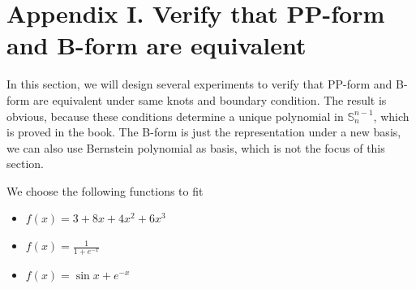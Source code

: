 \documentclass[a4paper]{article}
\begin{document}
\section{Appendix I. Verify that PP-form and B-form are equivalent}

In this section, we will design several experiments to verify that PP-form and B-form are equivalent under same knots and boundary condition. 
The result is obvious, because these conditions determine a unique polynomial in $\mathbb{S}_{n}^{n-1}$, which is proved in the book. The B-form is just 
the representation under a new basis, we can also use Bernstein polynomial as basis, which is not the focus of this section.

We choose the following functions to fit
\begin{itemize}
    \item $f(x) = 3+8x+4x^2+6x^3$
    \item $f(x) = \frac{1}{1 + e^{-x}}$
    \item $f(x) = \sin x + e^{-x}$
\end{itemize}
\end{document}
